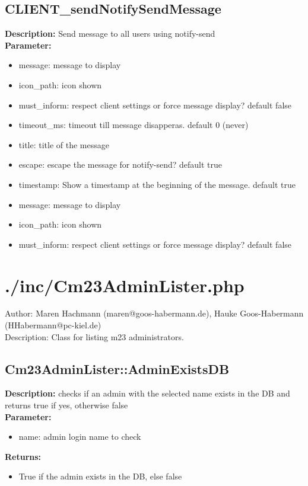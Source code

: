 \subsection{CLIENT\_sendNotifySendMessage}
\textbf{Description:} Send message to all users using notify-send\\
\textbf{Parameter:}
\begin{itemize}
\item message: message to display
\item icon\_path: icon shown
\item must\_inform: respect client settings or force message display? default false
\item timeout\_ms: timeout till message disapperas. default 0 (never)
\item title: title of the message
\item escape: escape the message for notify-send? default true
\item timestamp: Show a timestamp at the beginning of the message. default true
\item message: message to display
\item icon\_path: icon shown
\item must\_inform: respect client settings or force message display? default false
\end{itemize}

\newpage\section{./inc/Cm23AdminLister.php}
 Author: Maren Hachmann (maren@goos-habermann.de), Hauke Goos-Habermann (HHabermann@pc-kiel.de)\\
 Description: Class for listing m23 administrators.\\

\subsection{Cm23AdminLister::AdminExistsDB}
\textbf{Description:} checks if an admin with the selected name exists in the DB and returns true if yes, otherwise false\\
\textbf{Parameter:}
\begin{itemize}
\item name: admin login name to check
\end{itemize}
\textbf{Returns:}
\begin{itemize}
\item True if the admin exists in the DB, else false
\end{itemize}

